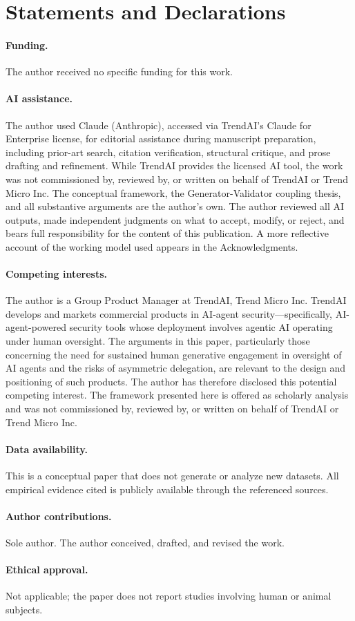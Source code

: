\documentclass[11pt,a4paper]{article}
\begin{document}
\section*{Statements and Declarations}

\paragraph{Funding.}
The author received no specific funding for this work.

\paragraph{AI assistance.}
The author used Claude (Anthropic), accessed via TrendAI's Claude for Enterprise license, for editorial assistance during manuscript preparation, including prior-art search, citation verification, structural critique, and prose drafting and refinement. While TrendAI provides the licensed AI tool, the work was not commissioned by, reviewed by, or written on behalf of TrendAI or Trend Micro Inc. The conceptual framework, the Generator-Validator coupling thesis, and all substantive arguments are the author's own. The author reviewed all AI outputs, made independent judgments on what to accept, modify, or reject, and bears full responsibility for the content of this publication. A more reflective account of the working model used appears in the Acknowledgments.

\paragraph{Competing interests.}
The author is a Group Product Manager at TrendAI, Trend Micro Inc. TrendAI develops and markets commercial products in AI-agent security---specifically, AI-agent-powered security tools whose deployment involves agentic AI operating under human oversight. The arguments in this paper, particularly those concerning the need for sustained human generative engagement in oversight of AI agents and the risks of asymmetric delegation, are relevant to the design and positioning of such products. The author has therefore disclosed this potential competing interest. The framework presented here is offered as scholarly analysis and was not commissioned by, reviewed by, or written on behalf of TrendAI or Trend Micro Inc.

\paragraph{Data availability.}
This is a conceptual paper that does not generate or analyze new datasets. All empirical evidence cited is publicly available through the referenced sources.

\paragraph{Author contributions.}
Sole author. The author conceived, drafted, and revised the work.

\paragraph{Ethical approval.}
Not applicable; the paper does not report studies involving human or animal subjects.



\end{document}
